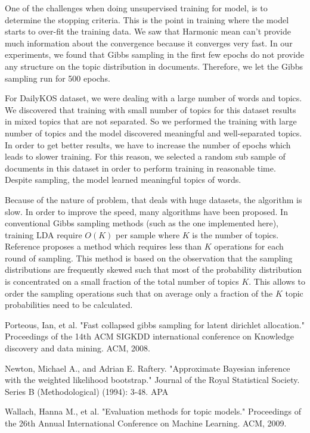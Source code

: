 \documentclass[twoside,12pt]{article}
\begin{document}
One of the challenges when doing unsupervised training for model, is to determine the stopping criteria. This is the point in training where the model starts to over-fit the training data. We saw that Harmonic mean can't provide much information about the convergence because it converges very fast. In our experiments, we found that Gibbs sampling in the first few epochs do not provide any structure on the topic distribution in documents. Therefore, we let the Gibbs sampling run for 500 epochs.  

For DailyKOS dataset, we were dealing with a large number of words and topics. We discovered that training with small number of topics for this dataset results in mixed topics that are not separated. So we performed the training with large number of topics and the model discovered meaningful and well-separated topics. In order to get better results, we have to increase the number of epochs which leads to slower training. For this reason, we selected a random sub sample of documents in this dataset in order to perform training in reasonable time. Despite sampling, the model learned meaningful topics of words.


Because of the nature of problem, that deals with huge datasets, the algorithm is slow. In order to improve the speed, many algorithms have been proposed. In conventional Gibbs sampling methods (such as the one implemented here), training LDA require $O(K)$ per sample where $K$ is the number of topics. Reference \cite{fastlda} proposes a method which requires less than $K$ operations for each round of sampling. This method is based on the observation that the sampling distributions are frequently skewed such that most of the probability distribution is concentrated on a small fraction of the total number of topics $K$. This allows to order the sampling operations such that on average only a fraction of the $K$ topic probabilities need to be calculated.


\begin{thebibliography}{9}
Porteous, Ian, et al. "Fast collapsed gibbs sampling for latent dirichlet allocation." Proceedings of the 14th ACM SIGKDD international conference on Knowledge discovery and data mining. ACM, 2008.


Newton, Michael A., and Adrian E. Raftery. "Approximate Bayesian inference with the weighted likelihood bootstrap." Journal of the Royal Statistical Society. Series B (Methodological) (1994): 3-48.
APA	

Wallach, Hanna M., et al. "Evaluation methods for topic models." Proceedings of the 26th Annual International Conference on Machine Learning. ACM, 2009.

\end{thebibliography}
\end{document}
